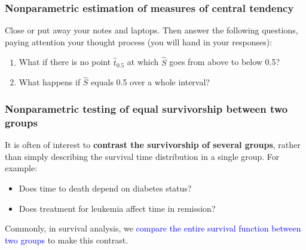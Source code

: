 \documentclass[12pt, 
hyperref={colorlinks=true, linkcolor=blue, urlcolor=cyan},dvipsnames]{beamer}
\begin{document}
\begin{frame}
\frametitle{Nonparametric estimation of measures of central tendency}
Close or put away your notes and laptops. Then answer the following questions, paying attention your thought process (you will hand in your responses):
\begin{enumerate}
\item What if there is no point $\hat{t}_{0.5}$ at which $\widehat{S}$ goes from above to below 0.5?
\item What happens if $\widehat{S}$ equals 0.5 over a whole interval?
\end{enumerate}

\end{frame}

\begin{frame}
\frametitle{Nonparametric testing of equal survivorship between two groups}

It is often of interest to \textbf{contrast the survivorship of several groups}, rather than simply describing the survival time distribution in a single group. For example:
\begin{itemize}
\item Does time to death depend on diabetes status?
\item Does treatment for leukemia affect time in remission?
\end{itemize}

Commonly, in survival analysis, we \textcolor{blue}{compare the entire survival function between two groups} to make this contrast.
\end{frame}
\end{document}
